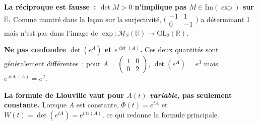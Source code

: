 \begin{mdframed}[style=cexbar]
  \textbf{La réciproque est fausse~: $\det M > 0$ n'implique pas $M \in \mathrm{Im}(\exp)$
  sur $\mathbb{R}$.}\enspace{}
  Comme montré dans la leçon sur la surjectivité,
  $\bigl(\begin{smallmatrix}-1&1\\0&-1\end{smallmatrix}\bigr)$ a déterminant $1$
  mais n'est pas dans l'image de $\exp:\mathcal{M}_2(\mathbb{R})\to\mathrm{GL}_2(\mathbb{R})$.

  \smallskip\noindent
  \textbf{Ne pas confondre $\det(e^A)$ et $e^{\det(A)}$.}\enspace{}
  Ces deux quantités sont généralement différentes~: pour
  $A = \begin{pmatrix}1&0\\0&2\end{pmatrix}$,
  $\det(e^A) = e^3$ mais $e^{\det(A)} = e^2$.

  \smallskip\noindent
  \textbf{La formule de Liouville vaut pour $A(t)$ \emph{variable}, pas seulement constante.}\enspace{}
  Lorsque $A$ est constante, $\Phi(t) = e^{tA}$ et
  $W(t) = \det(e^{tA}) = e^{t\,\mathrm{tr}(A)}$, ce qui redonne la formule principale.
\end{mdframed}

\vspace{6pt}
\exolabel{}

